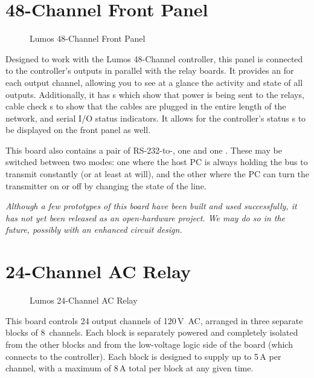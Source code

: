 \documentclass[letterpaper,twoside,onecolumn,openright,final]{memoir}
\begin{document}
\section{48-Channel Front Panel}
\begin{figure}
  \begin{center}
  \end{center}
  \caption{Lumos 48-Channel Front Panel}
\end{figure}
Designed to work with the Lumos 48-Channel controller, this panel is connected to the controller's outputs
in parallel with the relay boards.  It provides an  for each output channel, allowing you
to see at a glance the activity and state of all outputs.  Additionally, it has s which show
that power is being sent to the relays, cable check s to show that the cables are plugged in
the entire length of the network, and serial I/O status indicators. It allows for the controller's status
s to be displayed on the front panel as well.

This board also contains a pair of RS-232-to-, one  and one .
These may be switched between two modes: one where the host PC is always holding the bus to transmit
constantly (or at least at will), and the other where the PC can turn the transmitter on or off by
changing the state of the  line.

\emph{Although a few prototypes of this board have been built and used successfully, it has not yet been
released as an open-hardware project.  We may do so in the future, possibly with an enhanced circuit
design.}

\section{24-Channel AC Relay}
\begin{figure}
  \begin{center}
  \end{center}
  \caption{Lumos 24-Channel AC Relay}
\end{figure}
This board controls 24 output channels of 120\,V~AC, arranged in three separate blocks of 8~channels.
Each block is separately powered and completely isolated from the other blocks and from the low-voltage
logic side of the board (which connects to the controller).  Each block is designed to supply up to
5\,A per channel, with a maximum of 8\,A total per block at any given time.
\end{document}
